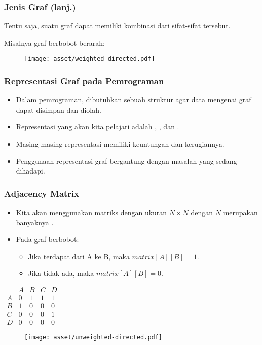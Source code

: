 \begin{frame}
\frametitle{Jenis Graf (lanj.)}
Tentu saja, suatu graf dapat memiliki kombinasi dari sifat-sifat tersebut.

Misalnya graf berbobot berarah:
\newline
\begin{figure}
  \centering
  \texttt{[image: asset/weighted-directed.pdf]}
\end{figure}
\end{frame}

\begin{frame}
\frametitle{Representasi Graf pada Pemrograman}

\begin{itemize}
  \item Dalam pemrograman, dibutuhkan sebuah struktur agar data mengenai graf dapat disimpan dan diolah.
  \item Representasi yang akan kita pelajari adalah \fadjacencymatrix, \fadjacencylist, dan \fedgelist.
  \item Masing-masing representasi memiliki keuntungan dan kerugiannya.
  \item Penggunaan representasi graf bergantung dengan masalah yang sedang dihadapi.
\end{itemize}
\end{frame}

\begin{frame}
\frametitle{Adjacency Matrix}
\begin{itemize}
  \item Kita akan menggunakan matriks dengan ukuran $N \times N$ dengan $N$ merupakan banyaknya \fnode.
  \item Pada graf berbobot:
  \begin{itemize}
    \item Jika terdapat \fedge dari A ke B, maka $matrix[A][B] = 1$. 
    \item Jika tidak ada, maka $matrix[A][B] = 0$.
  \end{itemize}
\end{itemize}

\begin{center}
\begin{multicols}{2}
  $\begin{array}{c|cccc}
      & A & B & C & D \\ \hline
    A & 0 & 1 & 1 & 1 \\
    B & 1 & 0 & 0 & 0 \\
    C & 0 & 0 & 0 & 1 \\
    D & 0 & 0 & 0 & 0
  \end{array}$
  \break
  \begin{figure}
    \texttt{[image: asset/unweighted-directed.pdf]}
  \end{figure}
\end{multicols} 
\end{center}
\end{frame}

